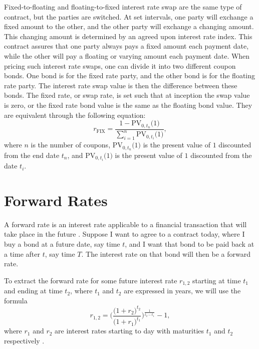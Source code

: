 Fixed-to-floating and floating-to-fixed interest rate swap are the same type of contract, but the parties are switched. At set intervals, one party will exchange a fixed amount to the other, and the other party will exchange a changing amount. This changing amount is determined by an agreed upon interest rate index. This contract assures that one party always pays a fixed amount each payment date, while the other will pay a floating or varying amount each payment date. When pricing such interest rate swaps, one can divide it into two different coupon bonds. One bond is for the fixed rate party, and the other bond is for the floating rate party. The interest rate swap value is then the difference between these bonds. The fixed rate, or swap rate, is set such that at inception the swap value is zero, or the fixed rate bond value is the same as the floating bond value. They are equivalent through the following equation: \begin{equation} \label{eq:theory swap rate}
    r_\text{FIX} = \frac{1 - \text{PV}_{0,t_n} \bigl( 1 \bigr)}{\sum_{i=1}^n \text{PV}_{0,t_i} \bigl( 1 \bigr)},
\end{equation} where $n$ is the number of coupons, $\text{PV}_{0,t_n} \bigl( 1 \bigr)$ is the present value of $1$ discounted from the end date $t_n$, and $\text{PV}_{0,t_i} \bigl( 1 \bigr)$ is the present value of $1$ discounted from the date $t_i$. \cite{analyst_prep_swap_value}

\newpage



\section{Forward Rates}

\noindent A forward rate is an interest rate applicable to a financial transaction that will take place in the future \cite{investopedia_forward_rate}. Suppose I want to agree to a contract today, where I buy a bond at a future date, say time $t$, and I want that bond to be paid back at a time after $t$, say time $T$. The interest rate on that bond will then be a forward rate.

To extract the forward rate for some future interest rate $r_{1,2}$ starting at time $t_1$ and ending at time $t_2$, where $t_1$ and $t_2$ are expressed in years, we will use the formula \begin{equation} \label{forward_formula}
    r_{1,2} = \Biggl( \frac{\bigl( 1 + r_2 \bigr)^{t_2}}{\bigl( 1 + r_1 \bigr)^{t_1}} \Biggr)^{\frac{1}{t_2 - t_1}} - 1,
\end{equation} where $r_1$ and $r_2$ are interest rates starting to day with maturities $t_1$ and $t_2$ respectively \cite{investopedia_forward_rate}.

